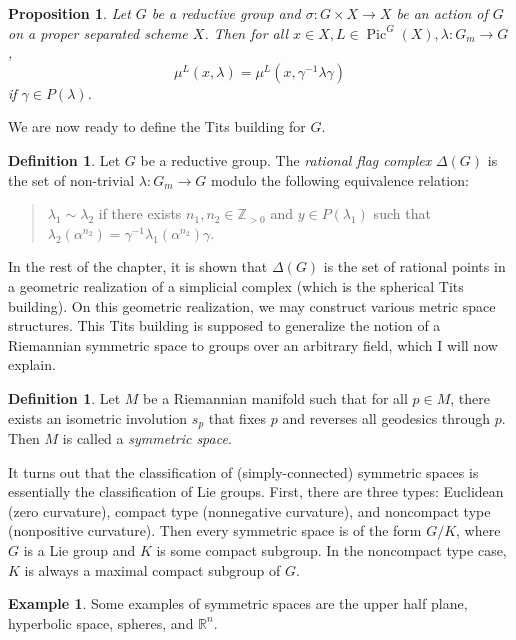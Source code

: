 \documentclass[leqno, openany]{memoir}
\newtheorem{prop}[thm]{Proposition}
\theoremstyle{definition}
\newtheorem{defn}[thm]{Definition}
\newtheorem{exm}[thm]{Example}
\theoremstyle{remark}
\theoremstyle{plain}
\theoremstyle{definition}
\theoremstyle{remark}
\newcommand{\R}{\mathbb{R}}
\newcommand{\Z}{\mathbb{Z}}
\DeclareMathOperator{\Pic}{Pic}
\begin{document}
\begin{prop} Let $G$ be a reductive group and $\sigma \colon G \times X \to X$
    be an action of $G$ on a proper separated scheme $X$. Then for all $x \in
    X, L \in \Pic^G(X), \lambda \colon G_m \to G$, \[ \mu^L(x, \lambda) =
    \mu^L(x, \gamma^{-1} \lambda \gamma) \] if $\gamma \in P(\lambda)$.
\end{prop}

We are now ready to define the Tits building for $G$.  \begin{defn} Let $G$ be
    a reductive group. The \textit{rational flag complex} $\Delta(G)$ is the
    set of non-trivial $\lambda \colon G_m \to G$ modulo the following
    equivalence relation: \begin{quotation} $\lambda_1 \sim \lambda_2$ if there
    exists $n_1, n_2 \in \Z_{>0}$ and $y \in P(\lambda_1)$ such that
$\lambda_2(\alpha^{n_2}) = \gamma^{-1} \lambda_1(\alpha^{n_2}) \gamma$.
\end{quotation} \end{defn}

In the rest of the chapter, it is shown that $\Delta(G)$ is the set of rational
points in a geometric realization of a simplicial complex (which is the
spherical Tits building). On this geometric realization, we may construct
various metric space structures. This Tits building is supposed to generalize
the notion of a Riemannian symmetric space to groups over an arbitrary field,
which I will now explain.

\begin{defn} Let $M$ be a Riemannian manifold such that for all $p \in M$,
there exists an isometric involution $s_p$ that fixes $p$ and reverses all
geodesics through $p$. Then $M$ is called a \textit{symmetric space}.
\end{defn}

It turns out that the classification of (simply-connected) symmetric spaces is
essentially the classification of Lie groups. First, there are three types:
Euclidean (zero curvature), compact type (nonnegative curvature), and
noncompact type (nonpositive curvature). Then every symmetric space is of the
form $G/K$, where $G$ is a Lie group and $K$ is some compact subgroup. In the
noncompact type case, $K$ is always a maximal compact subgroup of $G$.

\begin{exm} Some examples of symmetric spaces are the upper half plane,
hyperbolic space, spheres, and $\R^n$.  \end{exm}
\end{document}
